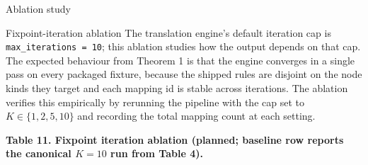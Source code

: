 \documentclass[
  ignorenonframetext,
]{beamer}
\begin{document}
\begin{frame}[fragile]{Ablation study}
\begin{block}{Fixpoint-iteration ablation}
\protect{}\label{fixpoint-iteration-ablation}
The translation engine's default iteration cap is
\texttt{max\_iterations\ =\ 10}; this ablation studies how the output
depends on that cap. The expected behaviour from Theorem 1 is that the
engine converges in a single pass on every packaged fixture, because the
shipped rules are disjoint on the node kinds they target and each
mapping id is stable across iterations. The ablation verifies this
empirically by rerunning the pipeline with the cap set to
\(K \in \{1, 2, 5, 10\}\) and recording the total mapping count at each
setting.

\textbf{Table 11. Fixpoint iteration ablation (planned; baseline row
reports the canonical \(K = 10\) run from Table 4).}


\end{block}
\end{frame}
\end{document}
